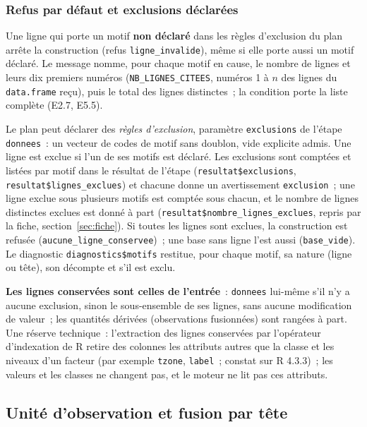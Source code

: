 \documentclass[a4paper,11pt]{article}
\newcommand{\code}[1]{\texttt{\small #1}}
\begin{document}
\subsubsection*{Refus par défaut et exclusions déclarées}

Une ligne qui porte un motif \textbf{non déclaré} dans les règles d'exclusion
du plan arrête la construction (refus \code{ligne\_invalide}), même si elle
porte aussi un motif déclaré. Le message nomme, pour chaque motif en cause, le
nombre de lignes et leurs dix premiers numéros (\code{NB\_LIGNES\_CITEES},
numéros 1 à $n$ des lignes du \code{data.frame} reçu), puis le total des lignes
distinctes~; la condition porte la liste complète (E2.7, E5.5).

\medskip
Le plan peut déclarer des \emph{règles d'exclusion}, paramètre
\code{exclusions} de l'étape \code{donnees}~: un vecteur de codes de motif sans
doublon, vide explicite admis. Une ligne est exclue si l'un de ses motifs est
déclaré. Les exclusions sont comptées et listées par motif dans le résultat de
l'étape (\code{resultat\$exclusions}, \code{resultat\$lignes\_exclues}) et
chacune donne un avertissement \code{exclusion}~; une ligne exclue sous
plusieurs motifs est comptée sous chacun, et le nombre de lignes distinctes
exclues est donné à part (\code{resultat\$nombre\_lignes\_exclues}, repris
par la fiche, section~\ref{sec:fiche}). Si toutes les lignes sont
exclues, la construction est refusée (\code{aucune\_ligne\_conservee})~; une
base sans ligne l'est aussi (\code{base\_vide}). Le diagnostic
\code{diagnostics\$motifs} restitue, pour chaque motif, sa nature (ligne ou
tête), son décompte et s'il est exclu.

\medskip
\textbf{Les lignes conservées sont celles de l'entrée}~: \code{donnees}
lui-même s'il n'y a aucune exclusion, sinon le sous-ensemble de ses lignes,
sans aucune modification de valeur~; les quantités dérivées (observations
fusionnées) sont rangées à part. Une réserve technique~: l'extraction des
lignes conservées par l'opérateur d'indexation de R retire des colonnes les
attributs autres que la classe et les niveaux d'un facteur (par exemple
\code{tzone}, \code{label}~; constat sur R 4.3.3)~; les valeurs et les
classes ne changent pas, et le moteur ne lit pas ces attributs.

\subsection{Unité d'observation et fusion par tête}
\label{sec:unite-observation}
\end{document}
